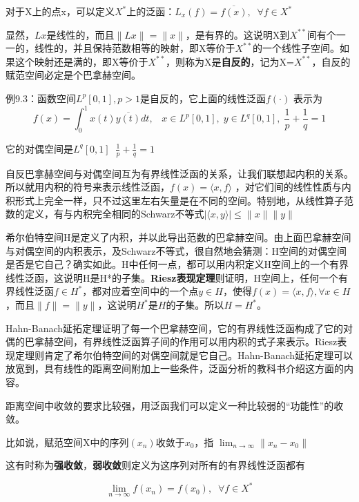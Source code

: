 对于X上的点x，可以定义$ X^* $上的泛函：$ L_x(f) = \overline{f(x)},\;\;  \forall f \in X^* $ 

显然，$ Lx $是线性的，而且$ \|Lx\| = \|x\| $，是有界的。这说明X到$ X^{**} $间有个一一的，线性的，并且保持范数相等的映射，即X等价于$ X^{**} $的一个线性子空间。如果这个映射还是满的，即X等价于$ X^{**} $，则称为X是\textbf{自反的}，记为X=$ X^{**} $，自反的赋范空间必定是个巴拿赫空间。


\kaishu\setlength{\leftskip}{1em}

例9.3：函数空间$ L^p[0,1], p>1 $是自反的，它上面的线性泛函$ f(\cdot) $ 表示为
\[f(x)=\int_0^1 x(t)\overline{y(t)}dt, \;\;\; x\in L^p[0,1],\; y \in L^q[0,1], \;\frac{1}{p}+\frac{1}{q}=1\]

它的对偶空间是$ L^q[0,1] \;\; \frac{1}{p}+\frac{1}{q}=1 $

\songti\setlength{\leftskip}{0em}


自反巴拿赫空间与对偶空间互为有界线性泛函的关系，让我们联想起内积的关系。所以就用内积的符号来表示线性泛函，$f(x)=\langle x,f\rangle$
，对它们间的线性性质与内积形式上完全一样，只不过这里左右矢量是在不同的空间。特别地，从线性算子范数的定义，有与内积完全相同的Schwarz不等式$  |\langle x,y\rangle |\leq \|x\|\|y\| $

希尔伯特空间H是定义了内积，并以此导出范数的巴拿赫空间。由上面巴拿赫空间与对偶空间的内积表示，及Schwarz不等式，很自然地会猜测：H空间的对偶空间是否是它自己？确实如此。H中任何一点，都可以用内积定义H空间上的一个有界线性泛函，这说明H是H*的子集。\textbf{Riesz表现定理}则证明，H空间上，任何一个有界线性泛函$ f\in H^* $，都对应着空间中的一个点$ y\in H $，使得$ f(x)= \langle x,f\rangle ,\forall x\in H $，而且$ \|f\| = \|y\| $，这说明$ H^* $是$ H $的子集。所以$ H=H^* $。

Hahn-Banach延拓定理证明了每一个巴拿赫空间，它的有界线性泛函构成了它的对偶的巴拿赫空间，有界线性泛函算子间的作用可以用内积的式子来表示。Riesz表现定理则肯定了希尔伯特空间的对偶空间就是它自己。Hahn-Banach延拓定理可以放宽到，具有线性的距离空间附加上一些条件，泛函分析的教科书介绍这方面的内容。

距离空间中收敛的要求比较强，用泛函我们可以定义一种比较弱的``功能性''的收敛。

比如说，赋范空间X中的序列$ (x_n) $收敛于$ x_0 $，指 $ \lim_{n\rightarrow \infty}\| x_n - x_0 \| $

这有时称为\textbf{强收敛}，\textbf{弱收敛}则定义为这序列对所有的有界线性泛函都有

\[\lim_{n\rightarrow\infty}f(x_n) = f(x_0),\;\; \forall f \in X^*\]

